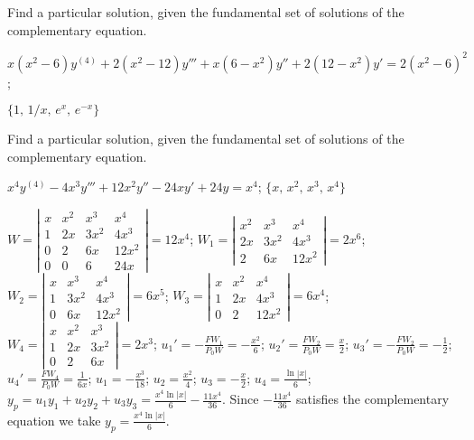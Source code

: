 \documentclass{ximera}
\begin{document}
\begin{problem}\label{exer:9.4.15}
Find a particular
solution, given the fundamental set of solutions of the complementary equation.

$x(x^2-6)y^{(4)}+2(x^2-12)y'''+x(6-x^2)y''+2(12-x^2)y'=2(x^2-6)^2$; \quad

 $\{1,\,1/x,\,e^x,\,e^{-x}\}$
\end{problem}

\begin{problem}\label{exer:9.4.16}
Find a particular
solution, given the fundamental set of solutions of the complementary equation.

$x^4y^{(4)}-4x^3y'''+12x^2y''-24xy'+24y=x^4$; \quad
$\{x,\,x^2,\,x^3,\,x^4\}$

\begin{solution}
$W=\left|\begin{array}{cccc}x&x^2&x^3&x^4\\
1&2x&3x^2&4x^3\\0&2&6x&12x^2\\0&0&6&24x
\end{array}\right|=12x^4$;
$W_1=\left|\begin{array}{cccc}x^2&x^3&x^4\\
2x&3x^2&4x^3\\2&6x&12x^2\end{array}\right|=2x^6$;
$W_2=\left|\begin{array}{cccc}x&x^3&x^4\\
1&3x^2&4x^3\\0&6x&12x^2\end{array}\right|=6x^5$;
$W_3=\left|\begin{array}{cccc}x&x^2&x^4\\
1&2x&4x^3\\0&2&12x^2\end{array}\right|=6x^4$;
$W_4=\left|\begin{array}{cccc}x&x^2&x^3\\
1&2x&3x^2\\0&2&6x\end{array}\right|=2x^3$;
$u_1'=-\frac{FW_1}{P_0W}=-\frac{x^2}{6}$;
$u_2'=\frac{FW_2}{P_0W}=\frac{x}{2}$;
$u_3'=-\frac{FW_2}{P_0W}=-\frac{1}{2}$;
$u_4'=\frac{FW_4}{P_0W}=\frac{1}{6x}$;
$u_1=-\frac{x^3}{18}$;
$u_2=\frac{x^2}{4}$;
$u_3=-\frac{x}{2}$;
$u_4=\frac{\ln|x|}{6}$;
$y_p=u_1y_1+u_2y_2+u_3y_3=\frac
{x^4\ln|x|}{6}-\frac{11x^4}{36}$.
Since $-\frac{11x^4}{36}$ satisfies the complementary equation we
take
$y_p=\frac{x^4\ln|x|}{6}$.
\end{solution}
\end{problem}
\end{document}
